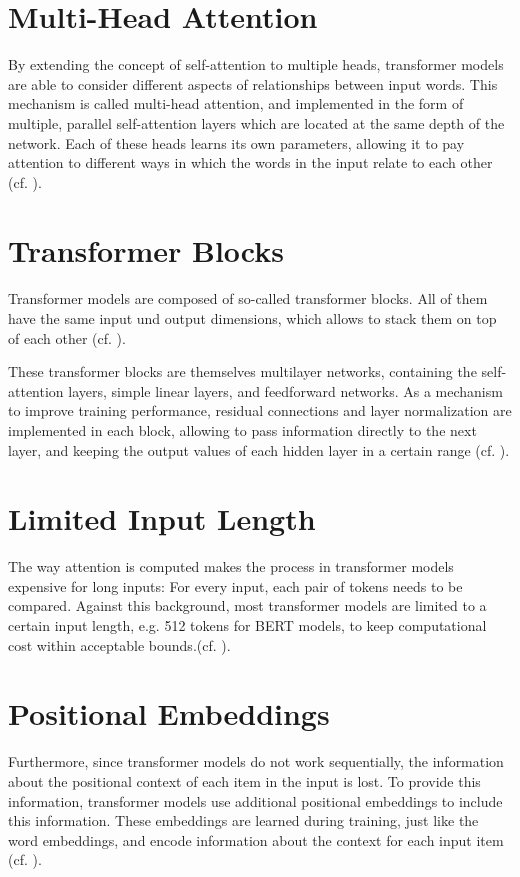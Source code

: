 \section{Multi-Head Attention}
By extending the concept of self-attention to multiple heads, transformer models are able to consider different aspects of relationships between input words. This mechanism is called multi-head attention, and implemented in the form of multiple, parallel self-attention layers which are located at the same depth of the network. Each of these heads learns its own parameters, allowing it to pay attention to different ways in which the words in the input relate to each other (cf. \cite[194]{jurafsky_2021}). 

\section{Transformer Blocks}
Transformer models are composed of so-called transformer blocks. All of them have the same input und output dimensions, which allows to stack them on top of each other (cf. \cite[194]{jurafsky_2021}). 

These transformer blocks are themselves multilayer networks, containing the self-attention layers, simple linear layers, and feedforward networks. As a mechanism to improve training performance, residual connections and layer normalization are implemented in each block, allowing to pass information directly to the next layer, and keeping the output values of each hidden layer in a certain range (cf. \cite[194]{jurafsky_2021}). 

\section{Limited Input Length}
The way attention is computed makes the process in transformer models expensive for long inputs: For every input, each pair of tokens needs to be compared. Against this background, most transformer models are limited to a certain input length, e.g. 512 tokens for BERT models, to keep computational cost within acceptable bounds.(cf. \cite[195]{jurafsky_2021}). 

\section{Positional Embeddings}
Furthermore, since transformer models do not work sequentially, the information about the positional context of each item in the input is lost. To provide this information, transformer models use additional positional embeddings to include this information. These embeddings are learned during training, just like the word embeddings, and encode information about the context for each input item (cf. \cite[195]{jurafsky_2021}). 

